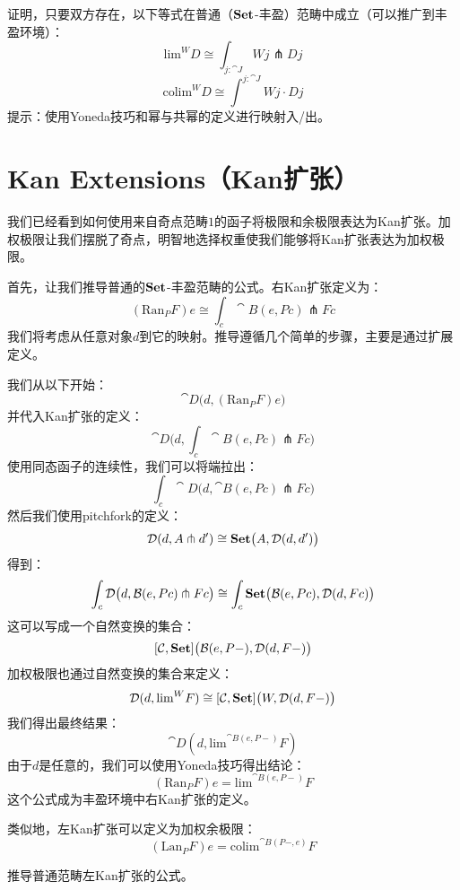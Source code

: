 \documentclass[DaoFP]{subfiles}
\begin{document}
 \begin{exercise}
  证明，只要双方存在，以下等式在普通（$\mathbf{Set}$-丰盈）范畴中成立（可以推广到丰盈环境）：
  \[ \text{lim}^W D \cong \int_{j \colon \cat J} W j \pitchfork D j \]
  \[ \text{colim}^W D \cong \int^{j \colon \cat J} W j \cdot D j \]
  提示：使用Yoneda技巧和幂与共幂的定义进行映射入/出。
 \end{exercise}

 \section{Kan Extensions（Kan扩张）}

 我们已经看到如何使用来自奇点范畴$1$的函子将极限和余极限表达为Kan扩张。加权极限让我们摆脱了奇点，明智地选择权重使我们能够将Kan扩张表达为加权极限。

 首先，让我们推导普通的$\mathbf{Set}$-丰盈范畴的公式。右Kan扩张定义为：
 \[ (\text{Ran}_P F) e \cong \int_c \cat B (e, P c) \pitchfork F c \]
 我们将考虑从任意对象$d$到它的映射。推导遵循几个简单的步骤，主要是通过扩展定义。

 我们从以下开始：
 \[ \cat D\big(d, (\text{Ran}_P F) e\big) \]
 并代入Kan扩张的定义：
 \[ \cat D\big(d, \int_c \cat B (e, P c) \pitchfork F c\big) \]
 使用同态函子的连续性，我们可以将端拉出：
 \[ \int_c \cat D\big(d,  \cat B (e, P c) \pitchfork F c\big) \]
 然后我们使用pitchfork的定义：
 \[ \mathcal{D} (d, A \pitchfork d') \cong \mathbf{Set}  \big(A, \mathcal{D}(d, d')\big) \]
 得到：
 \[ \int_c \mathcal{D}\big(d,  \mathcal{B} (e, P c) \pitchfork F c\big) \cong \int_c \mathbf{Set}\big( \mathcal{B}(e, P c), \mathcal{D}(d, F c)\big)\]
 这可以写成一个自然变换的集合：
 \[ [\mathcal{C}, \mathbf{Set}] \big(\mathcal{B}(e, P-), \mathcal{D}(d, F-)\big) \]
 加权极限也通过自然变换的集合来定义：
 \[  \mathcal D(d, \text{lim}^W F) \cong [\mathcal C, \mathbf{Set}] \big(W, \mathcal D(d, F-)\big) \]
 我们得出最终结果：
 \[ \cat D(d, \text{lim}^{\cat B (e, P-)} F) \]
 由于$d$是任意的，我们可以使用Yoneda技巧得出结论：
 \[ (\text{Ran}_P F) e = \text{lim}^{\cat B(e, P-)} F  \]
 这个公式成为丰盈环境中右Kan扩张的定义。

 类似地，左Kan扩张可以定义为加权余极限：
 \[ (\text{Lan}_P F) e = \text{colim}^{\cat B(P-, e)} F \]

 \begin{exercise}
  推导普通范畴左Kan扩张的公式。
 \end{exercise}
\end{document}
